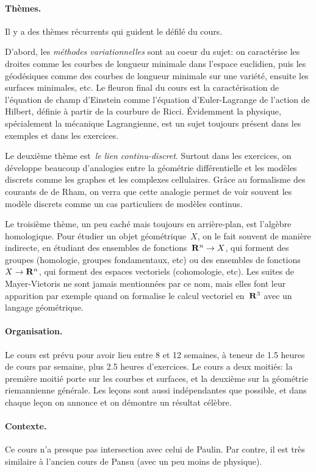 \paragraph{Thèmes.}
Il y a des thèmes récurrents qui guident le défilé du cours.

D'abord, les \emph{méthodes variationnelles} sont au coeur du sujet: on
caractérise les droites comme les courbes de longueur minimale dans l'espace
euclidien, puis les géodésiques comme des courbes de longueur minimale sur
une variété, ensuite les surfaces minimales, etc.  Le fleuron final du cours
est la caractérisation de l'équation de champ d'Einstein comme l'équation
d'Euler-Lagrange de l'action de Hilbert, définie à partir de la courbure de
Ricci.  Évidemment la physique, spécialement la mécanique Lagrangienne, est
un sujet toujours présent dans les exemples et dans les exercices.

Le deuxième thème est~\emph{le lien continu-discret}.  Surtout dans les
exercices, on développe beaucoup d'analogies entre la géométrie
différentielle et les modèles discrets comme les graphes et les complexes
cellulaires.  Grâce au formalisme des courants de de Rham, on verra que
cette analogie permet de voir souvent les modèle discrets comme un cas
particuliers de modèles continus.

Le troisième thème, un peu caché mais toujours en arrière-plan, est l'algèbre
homologique.  Pour étudier un objet géométrique~$X$, on le fait souvent de
manière indirecte, en étudiant des ensembles de fonctions~$\mathbf{R}^n\to X$, qui
forment des groupes (homologie, groupes fondamentaux, etc) ou des ensembles
de fonctions~$X\to\mathbf{R}^n$, qui forment des espaces vectoriels (cohomologie,
etc).  Les suites de Mayer-Vietoris ne sont jamais mentionnées par ce nom,
mais elles font leur apparition par exemple quand on formalise le calcul
vectoriel en~$\mathbf{R}^3$ avec un langage géométrique.

\paragraph{Organisation.}
Le cours est prévu pour avoir lieu entre 8 et 12 semaines, à teneur de 1.5
heures de cours par semaine, plus 2.5 heures d'exercices.  Le cours a deux
moitiés: la première moitié porte sur les courbes et surfaces, et la deuxième
sur la géométrie riemannienne générale.  Les leçons sont aussi indépendantes
que possible, et dans chaque leçon on annonce et on démontre un résultat
célèbre.

\paragraph{Contexte.}
Ce cours n'a presque pas intersection avec celui de Paulin.  Par contre, il
est très similaire à l'ancien cours de Pansu (avec un peu moins de physique).

